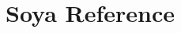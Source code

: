 \documentclass{manual}
\begin{document}







\chapter{Soya Reference}
















\end{document}
